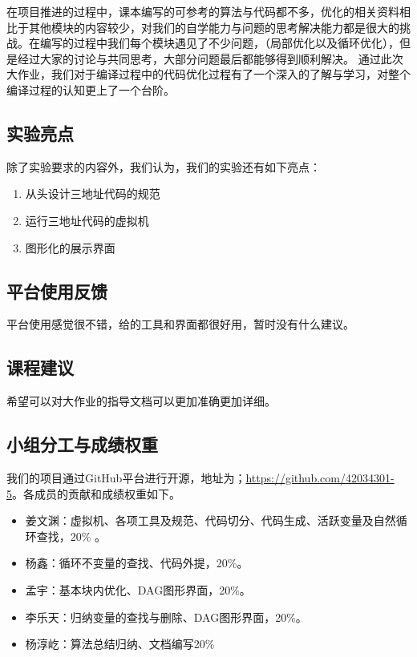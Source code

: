 \documentclass[cn,black,11pt,normal]{elegantnote}
\begin{document}
在项目推进的过程中，课本编写的可参考的算法与代码都不多，优化的相关资料相比于其他模块的内容较少，对我们的自学能力与问题的思考解决能力都是很大的挑战。在编写的过程中我们每个模块遇见了不少问题，（局部优化以及循环优化），但是经过大家的讨论与共同思考，大部分问题最后都能够得到顺利解决。
通过此次大作业，我们对于编译过程中的代码优化过程有了一个深入的了解与学习，对整个编译过程的认知更上了一个台阶。


\subsection{实验亮点}

除了实验要求的内容外，我们认为，我们的实验还有如下亮点：
\begin{enumerate}
    \item 从头设计三地址代码的规范
    \item 运行三地址代码的虚拟机
    \item 图形化的展示界面
\end{enumerate}

\subsection{平台使用反馈}

平台使用感觉很不错，给的工具和界面都很好用，暂时没有什么建议。

\subsection{课程建议}

希望可以对大作业的指导文档可以更加准确更加详细。

\subsection{小组分工与成绩权重}

我们的项目通过GitHub平台进行开源，地址为；\url{https://github.com/42034301-5}。各成员的贡献和成绩权重如下。

\begin{itemize}
    \item 姜文渊：虚拟机、各项工具及规范、代码切分、代码生成、活跃变量及自然循环查找，20\% 。
    \item 杨鑫：循环不变量的查找、代码外提，20\%。
    \item 孟宇：基本块内优化、DAG图形界面，20\%。
    \item 李乐天：归纳变量的查找与删除、DAG图形界面，20\%。
    \item 杨淳屹：算法总结归纳、文档编写20\%
\end{itemize}
\end{document}
